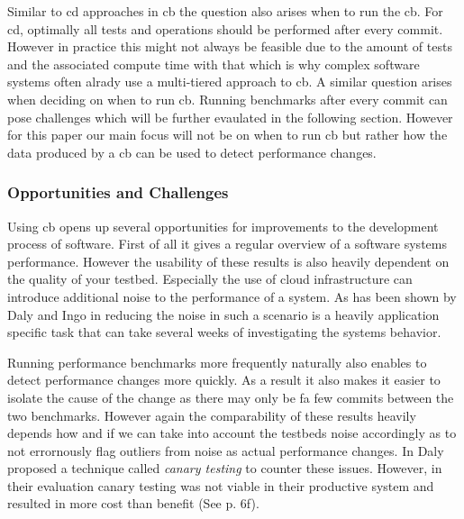\documentclass[	runningheads,
				a4paper]{llncs}
\begin{document}
	Similar to \gls{cd} approaches in \gls{cb} the question also arises when to run the \gls{cb}. For \gls{cd}, optimally all tests and operations should be performed after every commit. However in practice this might not always be feasible due to the amount of tests and the associated compute time with that which is why complex software systems often alrady use a multi-tiered approach to \gls{cb}. A similar question arises when deciding on when to run \gls{cb}. Running benchmarks after every commit can pose challenges which will be further evaulated in the following section. However for this paper our main focus will not be on when to run \gls{cb} but rather how the data produced by a \gls{cb} can be used to detect performance changes.

		\subsubsection{Opportunities and Challenges}
		\label{sssec:cd_challenges}

		Using \gls{cb} opens up several opportunities for improvements to the development process of software. First of all it gives a regular overview of a software systems performance. However the usability of these results is also heavily dependent on the quality of your testbed. Especially the use of cloud infrastructure can introduce additional noise to the performance of a system. As has been shown by Daly and Ingo in \cite{daly2019} reducing the noise in such a scenario is a heavily application specific task that can take several weeks of investigating the systems behavior.

	Running performance benchmarks more frequently naturally also enables to detect performance changes more quickly. As a result it also makes it easier to isolate the cause of the change as there may only be fa few commits between the two benchmarks. However again the comparability of these results heavily depends how and if we can take into account the testbeds noise accordingly as to not errornously flag outliers from noise as actual performance changes. In \cite{daly2021} Daly proposed a technique called \textit{canary testing} to counter these issues. However, in their evaluation canary testing was not viable in their productive system and resulted in more cost than benefit (See \cite{daly2021} p. 6f).
\end{document}
